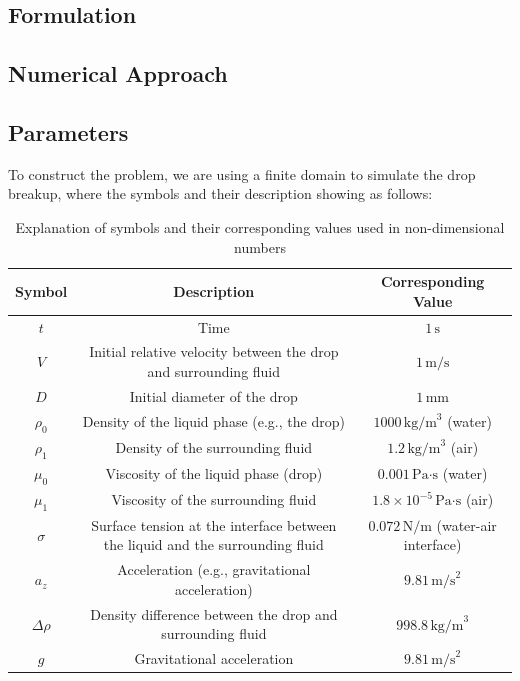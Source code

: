 \documentclass[12pt]{article}
\begin{document}
\subsection{Formulation}


\subsection{Numerical Approach}


\subsection{Parameters}







To construct the problem, we are using a finite domain to simulate the drop breakup, where the symbols and their description showing as follows:
\begin{table}[ht]
\scriptsize
\centering
\caption{Explanation of symbols and their corresponding values used in non-dimensional numbers}
\renewcommand{\arraystretch}{1.5} %
\begin{tabular}{|c|c|c|}
\hline
\textbf{Symbol} & \textbf{Description} & \textbf{Corresponding Value} \\ \hline
$t$     & Time & $1 \, \text{s}$ \\ \hline
$V$     & Initial relative velocity between the drop and surrounding fluid & $1 \, \text{m/s}$ \\ \hline
$D$     & Initial diameter of the drop & $1 \, \text{mm}$ \\ \hline
$\rho_0$ & Density of the liquid phase (e.g., the drop) & $1000 \, \text{kg/m}^3$ (water) \\ \hline
$\rho_1$ & Density of the surrounding fluid & $1.2 \, \text{kg/m}^3$ (air) \\ \hline
$\mu_0$  & Viscosity of the liquid phase (drop) & $0.001 \, \text{Pa·s}$ (water) \\ \hline
$\mu_1$  & Viscosity of the surrounding fluid & $1.8 \times 10^{-5} \, \text{Pa·s}$ (air) \\ \hline
$\sigma$ & Surface tension at the interface between the liquid and the surrounding fluid & $0.072 \, \text{N/m}$ (water-air interface) \\ \hline
$a_z$ & Acceleration (e.g., gravitational acceleration) & $9.81 \, \text{m/s}^2$ \\ \hline
$\Delta \rho$ & Density difference between the drop and surrounding fluid & $998.8 \, \text{kg/m}^3$ \\ \hline
$g$ & Gravitational acceleration & $9.81 \, \text{m/s}^2$ \\ \hline
\end{tabular}
\label{tab:SymbolExplanations}
\end{table}
\end{document}
